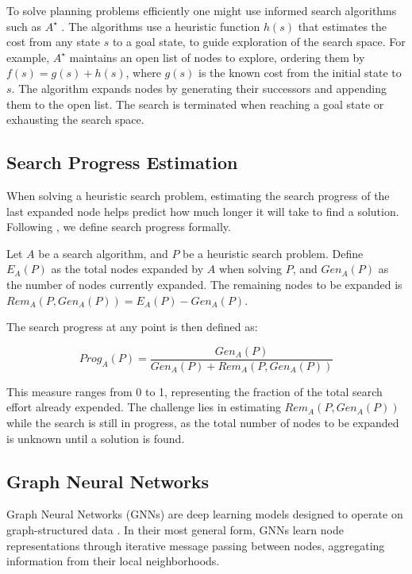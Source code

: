 \documentclass[letterpaper]{article}
\begin{document}
To solve planning problems efficiently one might use informed search algorithms such as $A^{\star}$ \citep{hart1968formal}. The algorithms use a heuristic function $h(s)$ that estimates the cost from any state $s$ to a goal state, to guide exploration of the search space. For example, $A^{\star}$ maintains an open list of nodes to explore, ordering them by $f(s) = g(s) + h(s)$, where $g(s)$ is the known cost from the initial state to $s$. The algorithm expands nodes by generating their successors and appending them to the open list. The search is terminated when reaching a goal state or exhausting the search space.

\subsection{Search Progress Estimation}

When solving a heuristic search problem, estimating the search progress of the last expanded node helps predict how much longer it will take to find a solution. Following \cite{sudry2022learning}, we define search progress formally.

Let $A$ be a search algorithm, and $P$ be a heuristic search problem. Define $E_A(P)$ as the total nodes expanded by $A$ when solving $P$, and $Gen_A(P)$ as the number of nodes currently expanded. The remaining nodes to be expanded is $Rem_A(P, Gen_A(P)) = E_A(P) - Gen_A(P)$.

The search progress at any point is then defined as:

\begin{equation*}
    Prog_A(P) = \frac{Gen_A(P)}{Gen_A(P) + Rem_A(P, Gen_A(P))}
\end{equation*}

This measure ranges from 0 to 1, representing the fraction of the total search effort already expended. The challenge lies in estimating $Rem_A(P, Gen_A(P))$ while the search is still in progress, as the total number of nodes to be expanded is unknown until a solution is found.

\subsection{Graph Neural Networks}
Graph Neural Networks (GNNs) are deep learning models designed to operate on graph-structured data \citep{scarselli2008graph}. In their most general form, GNNs learn node representations through iterative message passing between nodes, aggregating information from their local neighborhoods.
\end{document}
